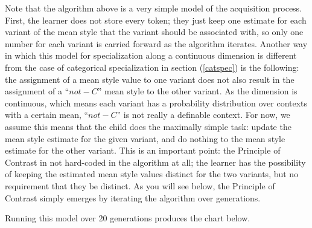 Note that the algorithm above is a very simple model of the acquisition process.
First, the learner does not store every token; they just keep one estimate for each variant of the mean style that the variant should be associated with, so only one number for each variant is carried forward as the algorithm iterates.
Another way in which this model for specialization along a continuous dimension is different from the case of categorical specialization in section (\ref{catspec}) is the following: the assignment of a mean style value to one variant does not also result in the assignment of a ``$not-C$'' mean style to the other variant.
As the dimension is continuous, which means each variant has a probability distribution over contexts with a certain mean, ``$not-C$'' is not really a definable context.
For now, we assume this means that the child does the maximally simple task: update the mean style estimate for the given variant, and do nothing to the mean style estimate for the other variant.
This is an important point: the Principle of Contrast in not hard-coded in the algorithm at all; the learner has the possibility of keeping the estimated mean style values distinct for the two variants, but no requirement that they be distinct.
As you will see below, the Principle of Contrast simply emerges by iterating the algorithm over generations.

Running this model over 20 generations produces the chart below.








